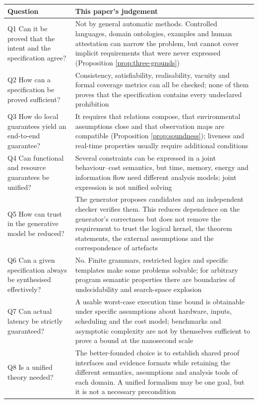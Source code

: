 \begin{remark}\label{rmk:q1q8}
\begin{longtable}{L{5.4cm}L{9.0cm}}
\toprule
\textbf{Question} & \textbf{This paper's judgement} \\
\midrule
\endhead
Q1 Can it be proved that the intent and the specification agree? &
  Not by general automatic methods. Controlled languages, domain ontologies, examples and
  human attestation can narrow the problem, but cannot cover implicit requirements that were
  never expressed (Proposition \ref{prop:three-grounds}) \\
Q2 How can a specification be proved sufficient? &
  Consistency, satisfiability, realisability, vacuity and formal coverage metrics can all be
  checked; none of them proves that the specification contains every undeclared prohibition \\
Q3 How do local guarantees yield an end-to-end guarantee? &
  It requires that relations compose, that environmental assumptions close and that
  observation maps are compatible (Proposition \ref{prop:soundness}); liveness and real-time
  properties usually require additional conditions \\
Q4 Can functional and resource guarantees be unified? &
  Several constraints can be expressed in a joint behaviour--cost semantics, but time,
  memory, energy and information flow need different analysis models; joint expression is
  not unified solving \\
Q5 How can trust in the generative model be reduced? &
  The generator proposes candidates and an independent checker verifies them. This reduces
  dependence on the generator's correctness but does not remove the requirement to trust the
  logical kernel, the theorem statements, the external assumptions and the correspondence of
  artefacts \\
Q6 Can a given specification always be synthesised effectively? &
  No. Finite grammars, restricted logics and specific templates make some problems solvable;
  for arbitrary program semantic properties there are boundaries of undecidability and
  search-space explosion \\
Q7 Can actual latency be strictly guaranteed? &
  A usable worst-case execution time bound is obtainable under specific assumptions about
  hardware, inputs, scheduling and the cost model; benchmarks and asymptotic complexity are
  not by themselves sufficient to prove a bound at the nanosecond scale \\
Q8 Is a unified theory needed? &
  The better-founded choice is to establish shared proof interfaces and evidence formats
  while retaining the different semantics, assumptions and analysis tools of each domain. A
  unified formalism may be one goal, but it is not a necessary precondition \\
\bottomrule
\end{longtable}
\end{remark}

